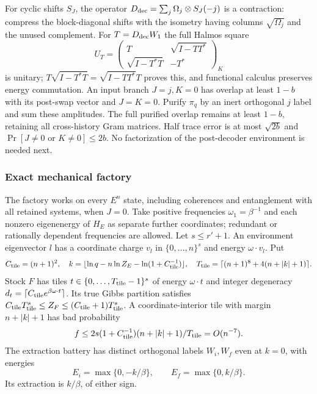 For cyclic shifts $S_J$, the operator
$D_{\rm dec}=\sum_j\Omega_j\otimes S_J(-j)$ is a contraction:
compress the block-diagonal shifts with the isometry having columns
$\sqrt{\Omega_j}$ and the unused complement.
For $T=D_{\rm dec}W_1$ the full Halmos square
\[
 U_T=\begin{pmatrix}T&\sqrt{I-TT^*}\\
                 \sqrt{I-T^*T}&-T^*\end{pmatrix}_K
\]
is unitary; $T\sqrt{I-T^*T}=\sqrt{I-TT^*}T$ proves this, and
functional calculus preserves energy commutation.
An input branch $J=j,K=0$ has overlap at least $1-b$ with its
post-swap vector and $J=K=0$. Purify $\pi_q$ by an inert orthogonal
$j$ label and sum these amplitudes. The full purified overlap remains
at least $1-b$, retaining all cross-history Gram matrices.
Half trace error is at most $\sqrt{2b}$ and
$\Pr[J\ne0\text{ or }K\ne0]\le2b$.
No factorization of the post-decoder environment is needed next.

\subsubsection{Exact mechanical factory}\label{kt:bp-factory}
The factory works on every $E^n$ state, including coherences and
entanglement with all retained systems, when $J=0$.
Take positive frequencies $\omega_1=\beta^{-1}$ and each nonzero
eigenenergy of $H_E$ as separate further coordinates; redundant or
rationally dependent frequencies are allowed. Let $s\le r'+1$.
An environment eigenvector $l$ has a coordinate charge $v_l$ in
$\{0,\ldots,n\}^s$ and energy $\omega\cdot v_l$. Put
\[
 C_{\rm tile}=(n+1)^2,\quad
 k=\lfloor\ln q-n\ln Z_E-\ln(1+C_{\rm tile}^{-1})\rfloor,\quad
 T_{\rm tile}=\lceil(n+1)^8+4(n+|k|+1)\rceil.
\]
Stock $F$ has tiles $t\in\{0,\ldots,T_{\rm tile}-1\}^s$ of energy
$\omega\cdot t$ and integer degeneracy
$d_t=\lceil C_{\rm tile}e^{\beta\omega\cdot t}\rceil$.
Its true Gibbs partition satisfies
$C_{\rm tile}T_{\rm tile}^s\le Z_F\le(C_{\rm tile}+1)T_{\rm tile}^s$.
A coordinate-interior tile with margin $n+|k|+1$ has bad probability
\[
 f\le2s(1+C_{\rm tile}^{-1})(n+|k|+1)/T_{\rm tile}=O(n^{-7}).
\]
The extraction battery has distinct orthogonal labels $W_i,W_f$
even at $k=0$, with energies
\[
 E_i=\max\{0,-k/\beta\},\qquad E_f=\max\{0,k/\beta\}.
\]
Its extraction is $k/\beta$, of either sign.

